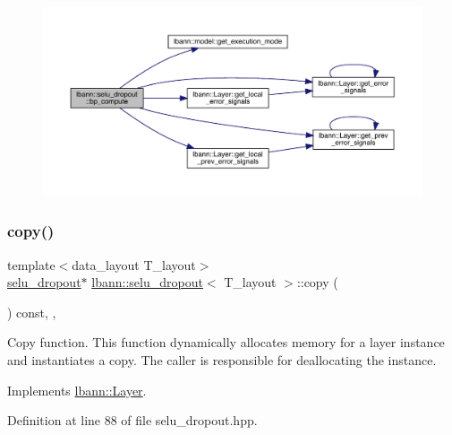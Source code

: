 \begin{figure}[H]
\begin{center}
\leavevmode
\includegraphics[width=350pt]{classlbann_1_1selu__dropout_afc80277386fef53296368579876bdb55_cgraph}
\end{center}
\end{figure}
\mbox{\label{classlbann_1_1selu__dropout_a58659790298874e1dc15a45b3199db91}} 
\subsubsection{\texorpdfstring{copy()}{copy()}}
{\footnotesize\ttfamily template$<$data\+\_\+layout T\+\_\+layout$>$ \\
\hyperlink{classlbann_1_1selu__dropout}{selu\+\_\+dropout}$\ast$ \hyperlink{classlbann_1_1selu__dropout}{lbann\+::selu\+\_\+dropout}$<$ T\+\_\+layout $>$\+::copy (\begin{DoxyParamCaption}{ }\end{DoxyParamCaption}) const\hspace{0.3cm}{\ttfamily [inline]}, {\ttfamily [override]}, {\ttfamily [virtual]}}

Copy function. This function dynamically allocates memory for a layer instance and instantiates a copy. The caller is responsible for deallocating the instance. 

Implements \hyperlink{classlbann_1_1Layer_af420f22bbac801c85483ade84588a23f}{lbann\+::\+Layer}.



Definition at line 88 of file selu\+\_\+dropout.\+hpp.


